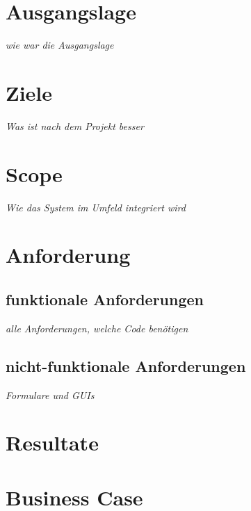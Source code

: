 \section{Ausgangslage}
\textit{wie war die Ausgangslage}

\section{Ziele}
\textit{Was ist nach dem Projekt besser}

\section{Scope}
\textit{Wie das System im Umfeld integriert wird}


\section{Anforderung}
\subsection{funktionale Anforderungen}
\textit{alle Anforderungen, welche Code benötigen}
\subsection{nicht-funktionale Anforderungen}
\textit{Formulare und GUIs}

\section{Resultate}
\section{Business Case}